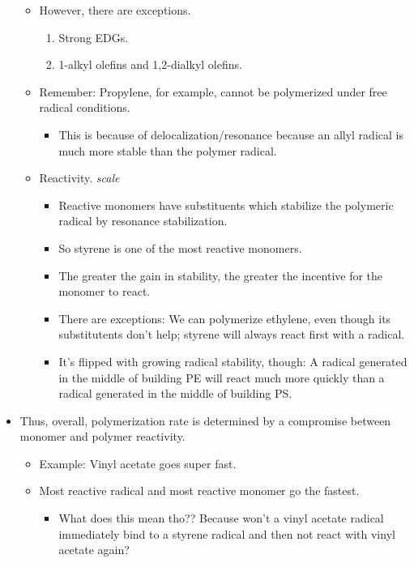 \documentclass[../notes.tex]{subfiles}
\begin{document}
\begin{itemize}
\begin{itemize}
        \item However, there are exceptions.
        \begin{enumerate}
            \item Strong EDGs.
            \item 1-alkyl olefins and 1,2-dialkyl olefins.
        \end{enumerate}
        \item Remember: Propylene, for example, cannot be polymerized under free radical conditions.
        \begin{itemize}
            \item This is because of delocalization/resonance because an allyl radical is much more stable than the polymer radical.
        \end{itemize}
        \item Reactivity.
        \emph{scale}
        \begin{itemize}
            \item Reactive monomers have substituents which stabilize the polymeric radical by resonance stabilization.
            \item So styrene is one of the most reactive monomers.
            \item The greater the gain in stability, the greater the incentive for the monomer to react.
            \item There are exceptions: We can polymerize ethylene, even though its substitutents don't help; styrene will always react first with a radical.
            \item It's flipped with growing radical stability, though: A radical generated in the middle of building PE will react much more quickly than a radical generated in the middle of building PS.
        \end{itemize}
    \end{itemize}
    \item Thus, overall, polymerization rate is determined by a compromise between monomer and polymer reactivity.
    \begin{itemize}
        \item Example: Vinyl acetate goes super fast.
        \item Most reactive radical and most reactive monomer go the fastest.
        \begin{itemize}
            \item What does this mean tho?? Because won't a vinyl acetate radical immediately bind to a styrene radical and then not react with vinyl acetate again?

\end{itemize}
\end{itemize}
\end{itemize}
\end{document}
